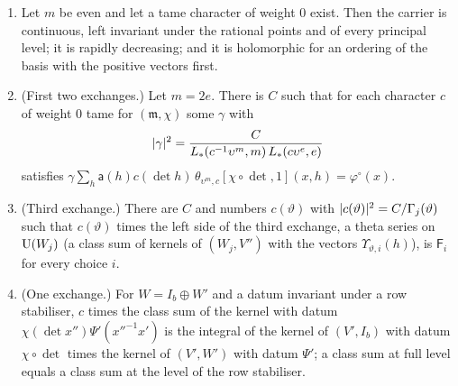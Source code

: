 \begin{proposition}\label{prop:three-exchanges}
\begin{enumerate}[label=\textup{(\alph*)}]
\item Let $m$ be even and let a tame character of weight $0$ exist. Then the carrier is continuous, left invariant under the rational points and of every principal level; it is rapidly decreasing; and
it is holomorphic for an ordering of the basis with the positive vectors first.
\item (First two exchanges.) Let $m=2e$. There is $C$ such that for each character $c$ of weight $0$ tame for $(\mathfrak m,\chi)$ some $\gamma$ with
\[
  \lvert \gamma\rvert^2=\frac{C}{L_*(c^{-1}\upsilon^m,m)\,L_*(c\upsilon^e,e)}
\]
satisfies
$\gamma\sum_h\mathsf a(h)c(\det h)\,\theta_{\upsilon^m,c}[\chi\circ\det,1](x,h)=\varphi^\circ(x)$.
\item (Third exchange.) There are $C$ and numbers $c(\vartheta)$ with $\lvert c(\vartheta)\rvert^2=C/\Gamma_j(\vartheta)$ such that $c(\vartheta)$ times the left side of the third exchange, a theta series on $\operatorname{U}(W_j)$ (a class sum of kernels
of $(W_j,V'')$ with the vectors $\Upsilon_{\vartheta,i}(h)$), is $\mathsf F_i$ for every choice $i$.
\item (One exchange.) For $W=I_b\oplus W'$ and a datum invariant under a row stabiliser, $c$ times the class sum of the kernel with datum $\chi(\det x'')\Psi'(x''^{-1}x')$ is the integral of the kernel of
$(V',I_b)$ with datum $\chi\circ\det$ times the kernel of $(V',W')$ with datum $\Psi'$; a class sum at full level equals a class sum at the level of the row stabiliser.
\end{enumerate}
\end{proposition}

